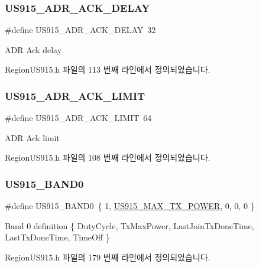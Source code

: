 \subsubsection{\texorpdfstring{U\+S915\+\_\+\+A\+D\+R\+\_\+\+A\+C\+K\+\_\+\+D\+E\+L\+AY}{US915\_ADR\_ACK\_DELAY}}
{\footnotesize\ttfamily \#define U\+S915\+\_\+\+A\+D\+R\+\_\+\+A\+C\+K\+\_\+\+D\+E\+L\+AY~32}

A\+DR Ack delay 

Region\+U\+S915.\+h 파일의 113 번째 라인에서 정의되었습니다.

\mbox{\label{group___r_e_g_i_o_n_u_s915_ga46682acd6e4eb5f39516361bdec8e4e7}} 
\subsubsection{\texorpdfstring{U\+S915\+\_\+\+A\+D\+R\+\_\+\+A\+C\+K\+\_\+\+L\+I\+M\+IT}{US915\_ADR\_ACK\_LIMIT}}
{\footnotesize\ttfamily \#define U\+S915\+\_\+\+A\+D\+R\+\_\+\+A\+C\+K\+\_\+\+L\+I\+M\+IT~64}

A\+DR Ack limit 

Region\+U\+S915.\+h 파일의 108 번째 라인에서 정의되었습니다.

\mbox{\label{group___r_e_g_i_o_n_u_s915_gafaab05d04cd5aa9b96a16ffd6b129c93}} 
\subsubsection{\texorpdfstring{U\+S915\+\_\+\+B\+A\+N\+D0}{US915\_BAND0}}
{\footnotesize\ttfamily \#define U\+S915\+\_\+\+B\+A\+N\+D0~\{ 1, \mbox{\hyperlink{group___r_e_g_i_o_n_u_s915_gaa43b92e4e5cf26691dda96f7c4969c25}{U\+S915\+\_\+\+M\+A\+X\+\_\+\+T\+X\+\_\+\+P\+O\+W\+ER}}, 0, 0, 0 \}}

Band 0 definition \{ Duty\+Cycle, Tx\+Max\+Power, Last\+Join\+Tx\+Done\+Time, Last\+Tx\+Done\+Time, Time\+Off \} 

Region\+U\+S915.\+h 파일의 179 번째 라인에서 정의되었습니다.

